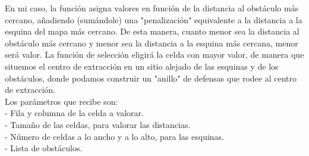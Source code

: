 En mi caso, la función asigna valores en función de la distancia al obstáculo más cercano, añadiendo (sumándole) una "penalización" equivalente a la distancia a la esquina del mapa más cercano. De esta manera, cuanto menor sea la distancia al obstáculo más cercano y menor sea la distancia a la esquina más cercana, menor será valor. La función de selección eligirá la celda con mayor valor, de manera que situemos el centro de extracción en un sitio alejado de las esquinas y de los obstáculos, donde podamos construir un "anillo" de defensas que rodee al centro de extracción. \\

Los parámetros que recibe son: \\
	- Fila y columna de la celda a valorar.\\
	- Tamaño de las celdas, para valorar las distancias.\\
	- Número de celdas a lo ancho y a lo alto, para las esquinas.\\
	- Lista de obstáculos.\\

